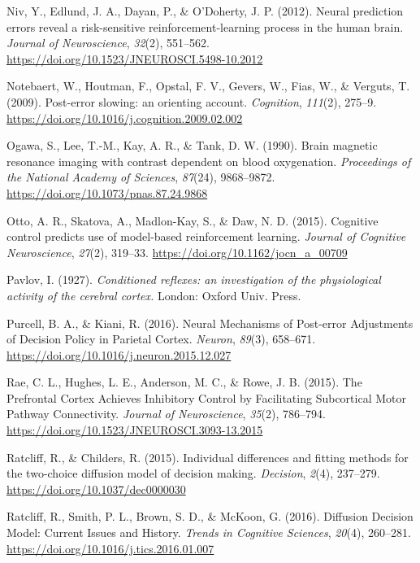 \documentclass[12pt,openany]{book}
\theoremstyle{definition}
\theoremstyle{definition}
\theoremstyle{definition}
\theoremstyle{remark}
\begin{document}
\hypertarget{ref-Niv2012}{}
Niv, Y., Edlund, J. A., Dayan, P., \& O'Doherty, J. P. (2012). Neural
prediction errors reveal a risk-sensitive reinforcement-learning process
in the human brain. \emph{Journal of Neuroscience}, \emph{32}(2),
551--562. \url{https://doi.org/10.1523/JNEUROSCI.5498-10.2012}

\hypertarget{ref-Notebaert2009}{}
Notebaert, W., Houtman, F., Opstal, F. V., Gevers, W., Fias, W., \&
Verguts, T. (2009). Post-error slowing: an orienting account.
\emph{Cognition}, \emph{111}(2), 275--9.
\url{https://doi.org/10.1016/j.cognition.2009.02.002}

\hypertarget{ref-Ogawa1990}{}
Ogawa, S., Lee, T.-M., Kay, A. R., \& Tank, D. W. (1990). Brain magnetic
resonance imaging with contrast dependent on blood oxygenation.
\emph{Proceedings of the National Academy of Sciences}, \emph{87}(24),
9868--9872. \url{https://doi.org/10.1073/pnas.87.24.9868}

\hypertarget{ref-Otto2015}{}
Otto, A. R., Skatova, A., Madlon-Kay, S., \& Daw, N. D. (2015).
Cognitive control predicts use of model-based reinforcement learning.
\emph{Journal of Cognitive Neuroscience}, \emph{27}(2), 319--33.
\url{https://doi.org/10.1162/jocn_a_00709}

\hypertarget{ref-Pavlov1927}{}
Pavlov, I. (1927). \emph{Conditioned reflexes: an investigation of the
physiological activity of the cerebral cortex.} London: Oxford Univ.
Press.

\hypertarget{ref-Purcell2016}{}
Purcell, B. A., \& Kiani, R. (2016). Neural Mechanisms of Post-error
Adjustments of Decision Policy in Parietal Cortex. \emph{Neuron},
\emph{89}(3), 658--671.
\url{https://doi.org/10.1016/j.neuron.2015.12.027}

\hypertarget{ref-Rae2015}{}
Rae, C. L., Hughes, L. E., Anderson, M. C., \& Rowe, J. B. (2015). The
Prefrontal Cortex Achieves Inhibitory Control by Facilitating
Subcortical Motor Pathway Connectivity. \emph{Journal of Neuroscience},
\emph{35}(2), 786--794.
\url{https://doi.org/10.1523/JNEUROSCI.3093-13.2015}

\hypertarget{ref-Ratcliff2015}{}
Ratcliff, R., \& Childers, R. (2015). Individual differences and fitting
methods for the two-choice diffusion model of decision making.
\emph{Decision}, \emph{2}(4), 237--279.
\url{https://doi.org/10.1037/dec0000030}

\hypertarget{ref-Ratcliff2016a}{}
Ratcliff, R., Smith, P. L., Brown, S. D., \& McKoon, G. (2016).
Diffusion Decision Model: Current Issues and History. \emph{Trends in
Cognitive Sciences}, \emph{20}(4), 260--281.
\url{https://doi.org/10.1016/j.tics.2016.01.007}
\end{document}
